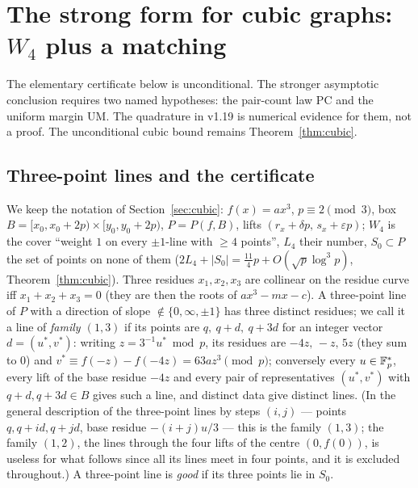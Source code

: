 
\section{The strong form for cubic graphs: \texorpdfstring{$W_4$}{W4} plus a matching}\label{sec:strong}

The elementary certificate below is unconditional.  The stronger asymptotic conclusion requires two named hypotheses:
the pair-count law PC and the uniform margin UM.  The quadrature in v1.19 is numerical evidence for them, not a proof.
The unconditional cubic bound remains Theorem~\ref{thm:cubic}.

\subsection*{Three-point lines and the certificate}

We keep the notation of Section~\ref{sec:cubic}: $f(x)=ax^3$, $p\equiv2\pmod3$, box $B=[x_0,x_0+2p)\times[y_0,y_0+2p)$, $P=P(f,B)$, lifts
$(r_x+\delta p,\,s_x+\varepsilon p)$; $W_4$ is the cover ``weight $1$ on every $\pm1$-line with $\ge4$ points'', $L_4$ their number, $S_0\subset P$
the set of points on none of them ($2L_4+|S_0|=\tfrac{11}4p+O(\sqrt p\log^3p)$, Theorem~\ref{thm:cubic}).  Three residues $x_1,x_2,x_3$ are collinear on
the residue curve iff $x_1+x_2+x_3=0$ (they are then the roots of $ax^3-mx-c$).  A three-point line of $P$ with a direction of slope $\notin\{0,\infty,\pm1\}$
has three distinct residues; we call it a line of \emph{family $(1,3)$} if its points are $q,\ q+d,\ q+3d$ for an integer vector $d=(u^*,v^*)$: writing
$z=3^{-1}u^*\bmod p$, its residues are $-4z,\,-z,\,5z$ (they sum to $0$) and $v^*\equiv f(-z)-f(-4z)=63az^3\pmod p$; conversely every $u\in\mathbb{F}_p^*$, every lift
of the base residue $-4z$ and every pair of representatives $(u^*,v^*)$ with $q+d,q+3d\in B$ gives such a line, and distinct data give distinct lines.
(In the general description of the three-point lines by steps $(i,j)$ — points $q,q+id,q+jd$, base residue $-(i+j)u/3$ — this is the family $(1,3)$; the
family $(1,2)$, the lines through the four lifts of the centre $(0,f(0))$, is useless for what follows since all its lines meet in four points, and it is
excluded throughout.)  A three-point line is \emph{good}
if its three points lie in $S_0$.

